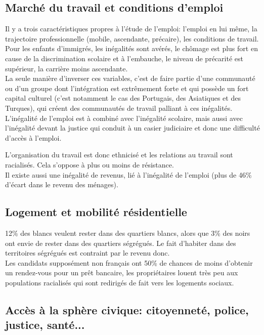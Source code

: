 \documentclass[10pt, a4paper, openany]{book}
\begin{document}
\subsection{Marché du travail et conditions d'emploi}

Il y a trois caractéristiques propres à l'étude de l'emploi: l'emploi en lui même, la trajectoire professionnelle (mobile, ascendante, précaire), les conditions de travail. \\
Pour les enfants d'immigrés, les inégalités sont avérés, le chômage est plus fort en cause de la discrimination scolaire et à l'embauche, le niveau de précarité est supérieur, la carrière moins ascendante. \\
La seule manière d'inverser ces variables, c'est de faire partie d'une communauté ou d'un groupe dont l'intégration est extrêmement forte et qui possède un fort capital culturel (c'est notamment le cas des Portugais, des Asiatiques et des Turques), qui créent des communautés de travail palliant à ces inégalités. \\
L'inégalité de l'emploi est à combiné avec l'inégalité scolaire, mais aussi avec l'inégalité devant la justice qui conduit à un casier judiciaire et donc une difficulté d'accès à l'emploi.


L'organisation du travail est donc ethnicisé et les relations au travail sont racialisés. Cela s'oppose à plus ou moins de résistance. \\
Il existe aussi une inégalité de revenus, lié à l'inégalité de l'emploi (plus de 46\% d'écart dans le revenu des ménages). \\


\subsection{Logement et mobilité résidentielle}

12\% des blancs veulent rester dans des quartiers blancs, alors que 3\% des noirs ont envie de rester dans des quartiers ségrégués. Le fait d'habiter dans des territoires ségrégués est contraint par le revenu donc. \\
Les candidats supposément non français ont 50\% de chances de moins d'obtenir un rendez-vous pour un prêt bancaire, les propriétaires louent très peu aux populations racialisés qui sont redirigés de fait vers les logements sociaux. 

\subsection{Accès à la sphère civique: citoyenneté, police, justice, santé...}
\end{document}
